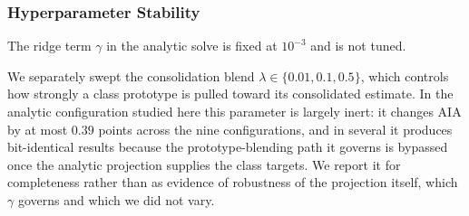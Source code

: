 \subsubsection{Hyperparameter Stability}
The ridge term $\gamma$ in the analytic solve is fixed at $10^{-3}$ and is not tuned.

We separately swept the consolidation blend $\lambda \in \{0.01, 0.1, 0.5\}$, which controls how strongly a class prototype is pulled toward its consolidated estimate. In the analytic configuration studied here this parameter is largely inert: it changes AIA by at most $0.39$ points across the nine configurations, and in several it produces bit-identical results because the prototype-blending path it governs is bypassed once the analytic projection supplies the class targets. We report it for completeness rather than as evidence of robustness of the projection itself, which $\gamma$ governs and which we did not vary.
